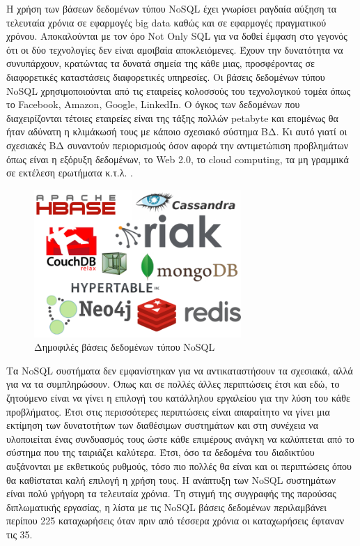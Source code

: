 	Η χρήση των βάσεων δεδομένων τύπου NoSQL έχει γνωρίσει ραγδαία αύξηση τα τελευταία χρόνια σε εφαρμογές big data καθώς και σε εφαρμογές πραγματικού χρόνου. Αποκαλούνται με τον όρο Not Only SQL για να δοθεί έμφαση στο γεγονός ότι οι δύο τεχνολογίες δεν είναι αμοιβαία αποκλειόμενες. Έχουν την δυνατότητα να συνυπάρχουν, κρατώντας τα δυνατά σημεία της κάθε μιας, προσφέροντας σε διαφορετικές καταστάσεις διαφορετικές υπηρεσίες. Οι βάσεις δεδομένων τύπου NoSQL χρησιμοποιούνται από τις εταιρείες κολοσσούς του τεχνολογικού τομέα όπως το Facebook, Amazon, Google, LinkedIn\cite{5993686}. Ο όγκος των δεδομένων που διαχειρίζονται τέτοιες εταιρείες είναι της τάξης πολλών petabyte και επομένως θα ήταν αδύνατη η κλιμάκωσή τους με κάποιο σχεσιακό σύστημα ΒΔ. Κι αυτό γιατί οι σχεσιακές ΒΔ συναντούν περιορισμούς όσον αφορά την αντιμετώπιση προβλημάτων όπως είναι η εξόρυξη δεδομένων, το Web 2.0, το cloud computing, τα μη γραμμικά σε εκτέλεση ερωτήματα κ.τ.λ. .
	
	\begin{figure}[h]
	    \centering
	    \includegraphics[width=0.7\textwidth]{NoSQL-DBs.png}
	    \caption{Δημοφιλές βάσεις δεδομένων τύπου NoSQL }
	    \label{fig:NoSQL-DBs}
	\end{figure}
	
	Τα NoSQL συστήματα δεν εμφανίστηκαν για να αντικαταστήσουν τα σχεσιακά, αλλά για να τα συμπληρώσουν. Όπως και σε πολλές άλλες περιπτώσεις έτσι και εδώ, το ζητούμενο είναι να γίνει η επιλογή του κατάλληλου εργαλείου για την λύση του κάθε προβλήματος. Έτσι στις περισσότερες περιπτώσεις είναι απαραίτητο να γίνει μια εκτίμηση των δυνατοτήτων των διαθέσιμων συστημάτων και στη συνέχεια να υλοποιείται ένας συνδυασμός τους ώστε κάθε επιμέρους ανάγκη να καλύπτεται από το σύστημα που της ταιριάζει καλύτερα. Έτσι, όσο τα δεδομένα του διαδικτύου αυξάνονται με εκθετικούς ρυθμούς, τόσο πιο πολλές θα είναι και οι περιπτώσεις όπου θα καθίσταται καλή επιλογή η χρήση τους. Η ανάπτυξη των NoSQL συστημάτων είναι πολύ γρήγορη τα τελευταία χρόνια. Τη στιγμή της συγγραφής της παρούσας διπλωματικής εργασίας, η λίστα με τις NoSQL βάσεις δεδομένων περιλαμβάνει περίπου 225 καταχωρήσεις όταν πριν από τέσσερα χρόνια οι καταχωρήσεις έφταναν τις 35\cite{numberOfNoSQL}.
		
